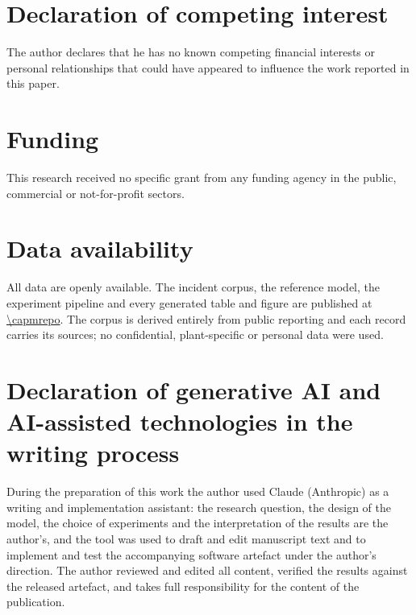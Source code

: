 \section*{Declaration of competing interest}

The author declares that he has no known competing financial interests or
personal relationships that could have appeared to influence the work reported
in this paper.

\section*{Funding}

This research received no specific grant from any funding agency in the public,
commercial or not-for-profit sectors.

\section*{Data availability}

All data are openly available. The incident corpus, the reference model, the
experiment pipeline and every generated table and figure are published at
\url{\capmrepo}. The corpus is derived entirely from public reporting and each
record carries its sources; no confidential, plant-specific or personal data
were used.

\section*{Declaration of generative AI and AI-assisted technologies in the writing process}

During the preparation of this work the author used Claude (Anthropic) as a
writing and implementation assistant: the research question, the design of the
model, the choice of experiments and the interpretation of the results are the
author's, and the tool was used to draft and edit manuscript text and to
implement and test the accompanying software artefact under the author's
direction. The author reviewed and edited all content, verified the results
against the released artefact, and takes full responsibility for the content of
the publication.

